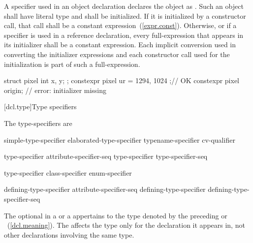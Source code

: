 \pnum
A  specifier used in an object
declaration declares the object as .
Such an object
shall have literal type and
shall be initialized.
If it is initialized by a constructor call,
that call shall be a constant expression~(\ref{expr.const}).
Otherwise,
or if a  specifier is used in a reference declaration,
every full-expression that appears in its initializer shall be a constant expression. \enternote Each
implicit conversion used in converting the initializer expressions and each constructor call
used for the initialization is part of such a full-expression. \exitnote
\enterexample
\begin{codeblock}
struct pixel { 
  int x, y; 
}; 
constexpr pixel ur = { 1294, 1024 };// OK 
constexpr pixel origin;             // error: initializer missing 
\end{codeblock}
\exitexample

[dcl.type]{Type specifiers}%

\pnum
The type-specifiers are

%
%
%
\begin{bnf}
\br
  simple-type-specifier\br
  elaborated-type-specifier\br
  typename-specifier\br
  cv-qualifier
\end{bnf}

\begin{bnf}
\br
    type-specifier attribute-specifier-seq\opt\br
    type-specifier type-specifier-seq
\end{bnf}

\begin{bnf}
\br
    type-specifier\br
    class-specifier\br
    enum-specifier
\end{bnf}

\begin{bnf}
\br
  defining-type-specifier attribute-specifier-seq\opt\br
  defining-type-specifier defining-type-specifier-seq
\end{bnf}

The optional  in a 
or a 
appertains
to the type denoted by the preceding 
or ~(\ref{dcl.meaning}). The
 affects the type only for the declaration it appears in,
not other declarations involving the same type.

